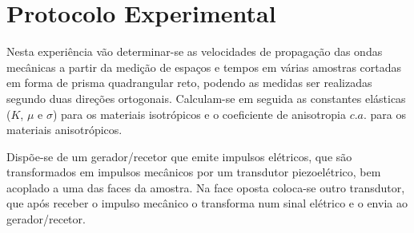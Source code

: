 \documentclass[a4paper,12pt]{article}
\begin{document}



\newpage
\section{\sf Protocolo Experimental}
Nesta experiência vão determinar-se as velocidades de propagação das ondas mecânicas a partir da medição de espaços e tempos em várias amostras cortadas em forma de prisma quadrangular reto, podendo as medidas ser realizadas segundo duas direções ortogonais.
 Calculam-se em seguida as constantes elásticas ($K$, $\mu$ e $\sigma$) para os materiais isotrópicos e o coeficiente de anisotropia $c.a.$ para os materiais anisotrópicos.
 
Dispõe-se de um gerador/recetor que emite impulsos elétricos, que são transformados em impulsos mecânicos por um transdutor piezoelétrico, bem acoplado a uma das faces da amostra. Na face oposta coloca-se outro transdutor, que após receber o impulso mecânico o transforma num sinal elétrico e o envia ao gerador/recetor.
\end{document}

